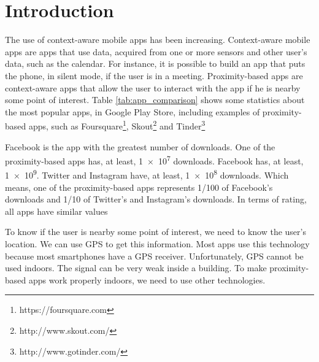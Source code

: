 
%
%

\section{Introduction}
\label{sec:introduction}


The use of context-aware mobile apps has been increasing.
Context-aware mobile apps are apps that use data, acquired
from one or more sensors and other user's data, 
such as the calendar. For instance, it is possible to
build an app that puts the phone, in silent mode, if the
user is in a meeting. Proximity-based apps are
context-aware apps that allow the user to interact
with the app if he is nearby some point of interest.
Table \ref{tab:app_comparison} shows some statistics
about the most popular apps, in Google Play Store,
including examples of proximity-based apps,
such as Foursquare\footnote{https://foursquare.com},
Skout\footnote{http://www.skout.com/} and
Tinder\footnote{http://www.gotinder.com/}



Facebook is the app with the
greatest number of downloads. One of the 
proximity-based apps has, at least, \num{1e7} downloads.
Facebook has, at least, \num{1e9}. Twitter and Instagram
have, at least, \num{1e8} downloads. Which means, one of
the proximity-based apps represents
1/100 of Facebook's downloads and 1/10 of Twitter's
and Instagram's downloads. In terms of rating, all apps
have similar values

To know if the user is nearby some point of interest,
we need to know the user's location. We can use GPS to
get this information. Most apps use this technology because
most smartphones have a GPS receiver. 
Unfortunately, GPS cannot be used indoors. The signal can
be very weak inside a building. To make proximity-based
apps work properly indoors, we need to use other 
technologies.
